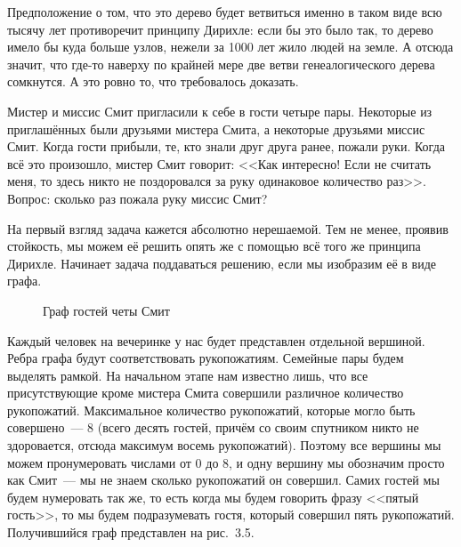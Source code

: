 \begin{example}
Предположение о том, что это дерево будет ветвиться именно в таком виде всю тысячу лет противоречит принципу Дирихле: если бы это было так, то дерево имело бы куда больше узлов, нежели за 1000 лет жило людей на земле. А отсюда значит, что где-то наверху по крайней мере две ветви генеалогического дерева сомкнутся. А это ровно то, что требовалось доказать.
\end{example}

\begin{example}
Мистер и миссис Смит пригласили к себе в гости четыре пары. Некоторые из приглашённых были друзьями мистера Смита, а некоторые друзьями миссис Смит. Когда гости прибыли, те, кто знали друг друга ранее, пожали руки. Когда всё это произошло, мистер Смит говорит: <<Как интересно! Если не считать меня, то здесь никто не поздоровался за руку одинаковое количество раз>>. Вопрос: сколько раз пожала руку миссис Смит?

На первый взгляд задача кажется абсолютно нерешаемой. Тем не менее, проявив стойкость, мы можем её решить опять же с помощью всё того же принципа Дирихле. Начинает задача поддаваться решению, если мы изобразим её в виде графа.

\begin{figure}[h]
\centering
{}
\caption{Граф гостей четы Смит}
\end{figure}

Каждый человек на вечеринке у нас будет представлен отдельной вершиной. Ребра графа будут соответствовать рукопожатиям. Семейные пары будем выделять рамкой. На начальном этапе нам известно лишь, что все присутствующие кроме мистера Смита совершили различное количество рукопожатий. Максимальное количество рукопожатий, которые могло быть совершено~--- 8 (всего десять гостей, причём со своим спутником никто не здоровается, отсюда максимум восемь рукопожатий). Поэтому все вершины мы можем пронумеровать числами от 0 до 8, и одну вершину мы обозначим просто как Смит~--- мы не знаем сколько рукопожатий он совершил. Самих гостей мы будем нумеровать так же, то есть когда мы будем говорить фразу <<пятый гость>>, то мы будем подразумевать гостя, который совершил пять рукопожатий. Получившийся граф представлен на рис.~3.5.


\end{example}
